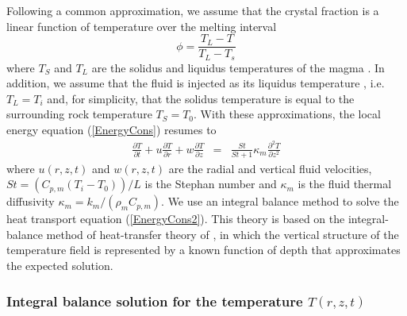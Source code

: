 Following a common approximation, we  assume that the crystal fraction
is a linear function of temperature over the melting interval
\begin{equation}
  \phi = \frac{T_L-T}{T_L-T_s}
  \label{meltfraction}
\end{equation}
where $T_S$ and $T_L$ are the solidus and liquidus temperatures of the
magma \citep{Hort:1997hk,Michaut:2006di}. In addition, we assume that
the fluid is  injected as its liquidus temperature ,  i.e. $T_L = T_i$
and, for simplicity, that the solidus  temperature  is  equal  to  the
surrounding rock  temperature $T_S  =T_0$. With  these approximations,
the local energy equation (\ref{EnergyCons}) resumes to
\begin{eqnarray}
  \frac{\partial T}{\partial t}+ u\frac{\partial T}{\partial r}
  + w\frac{\partial T}{\partial z}  &=& \frac{ St}{St+1}\kappa_m  \frac{\partial^2
                                        T}{\partial               z^2}
                                        \label{EnergyCons2}
\end{eqnarray}
where  $u(r,z,t)$ and  $w(r,z,t)$ are  the radial  and vertical  fluid
velocities,  $St  =\left(C_{p,m}(T_i-T_0)\right)/L$   is  the  Stephan
number   and    $\kappa_m$   is   the   fluid    thermal   diffusivity
$\kappa_m = k_m/(\rho_m C_{p,m})$.  We  use an integral balance method
to solve the heat transport equation (\ref{EnergyCons2}).  This theory
is based  on the  integral-balance method  of heat-transfer  theory of
\citet{Goodman:1958ue},  in  which  the   vertical  structure  of  the
temperature field  is represented  by a known  function of  depth that
approximates the expected solution.

\subsubsection{Integral   balance   solution   for   the   temperature
  $T(r,z,t)$}

